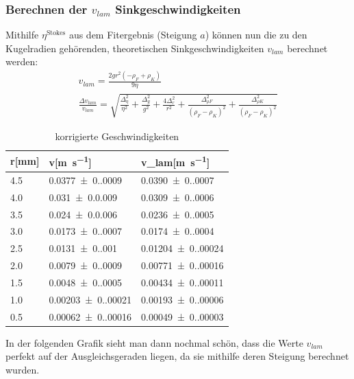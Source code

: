 
\subsubsection*{Berechnen der \(v_{lam}\) Sinkgeschwindigkeiten}
Mithilfe \(\eta^\mathrm{Stokes}\) aus dem Fitergebnis (Steigung \(a\)) können nun die zu den Kugelradien gehörenden, theoretischen Sinkgeschwindigkeiten \(v_{lam}\) berechnet werden:
\begin{gather}
    v_{lam}=\frac{2 g r^{2} \left(- \rho_{F} + \rho_{K}\right)}{9 \eta}\\
    \frac{\Delta v_{lam}}{v_{lam}}=\sqrt{\frac{\Delta_{\eta}^{2}}{\eta^{2}} + \frac{\Delta_{g}^{2}}{g^{2}} + \frac{4 \Delta_{r}^{2}}{r^{2}} + \frac{\Delta_{\rho F}^{2}}{\left(\rho_{F} - \rho_{K}\right)^{2}} + \frac{\Delta_{\rho K}^{2}}{\left(\rho_{F} - \rho_{K}\right)^{2}}}
\end{gather}

\begin{table}[htb]
  \centering
  \caption{korrigierte Geschwindigkeiten}
  \begin{tabularx}{\textwidth}{ZZZ}
    \toprule
        r[\unit{\milli\m}]&v[\unit{\m\per\s}]&v_{lam}[\unit{\m\per\s}]\\\midrule
        \num{4.5}&\num{0.0377(0.0009)}&\num{0.0390(0.0007)}\\
        \num{4.0}&\num{0.031(0.0009)}&\num{0.0309(0.0006)}\\
        \num{3.5}&\num{0.024(0.0006)}&\num{0.0236(0.0005)}\\
        \num{3.0}&\num{0.0173(0.0007)}&\num{0.0174(0.0004)}\\
        \num{2.5}&\num{0.0131(0.001)}&\num{0.01204(0.00024)}\\
        \num{2.0}&\num{0.0079(0.0009)}&\num{0.00771(0.00016)}\\
        \num{1.5}&\num{0.0048(0.0005)}&\num{0.00434(0.00011)}\\
        \num{1.0}&\num{0.00203(0.00021)}&\num{0.00193(0.00006)}\\
        \num{0.5}&\num{0.00062(0.00016)}&\num{0.00049(0.00003)}\\
    \bottomrule
  \end{tabularx}
\label{table:lamGeschw}  
\end{table}
\newpage

In der folgenden Grafik sieht man dann nochmal schön, dass die Werte \(v_{lam}\) perfekt auf der Ausgleichsgeraden liegen, da sie mithilfe deren Steigung berechnet wurden.

